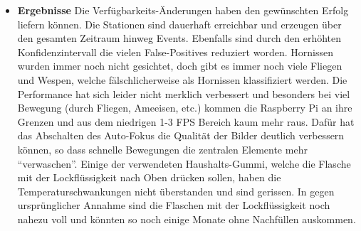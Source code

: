 \begin{itemize}
    \item \textbf{Ergebnisse}
    Die Verfügbarkeits-Änderungen haben den gewünschten Erfolg liefern können. Die Stationen sind dauerhaft erreichbar und erzeugen über den gesamten Zeitraum hinweg Events. Ebenfalls sind durch den erhöhten Konfidenzintervall die vielen False-Positives reduziert worden. Hornissen wurden immer noch nicht gesichtet, doch gibt es immer noch viele Fliegen und Wespen, welche fälschlicherweise als Hornissen klassifiziert werden. 
    Die Performance hat sich leider nicht merklich verbessert und besonders bei viel Bewegung (durch Fliegen, Ameeisen, etc.) kommen die Raspberry Pi an ihre Grenzen und aus dem niedrigen 1-3 FPS Bereich kaum mehr raus. Dafür hat das Abschalten des Auto-Fokus die Qualität der Bilder deutlich verbessern können, so dass schnelle Bewegungen die zentralen Elemente mehr \enquote{verwaschen}. 
    Einige der verwendeten Haushalts-Gummi, welche die Flasche mit der Lockflüssigkeit nach Oben drücken sollen, haben die Temperaturschwankungen nicht überstanden und sind gerissen. In gegen ursprünglicher Annahme sind die Flaschen mit der Lockflüssigkeit noch nahezu voll und könnten so noch einige Monate ohne Nachfüllen auskommen. 
    

\end{itemize}
